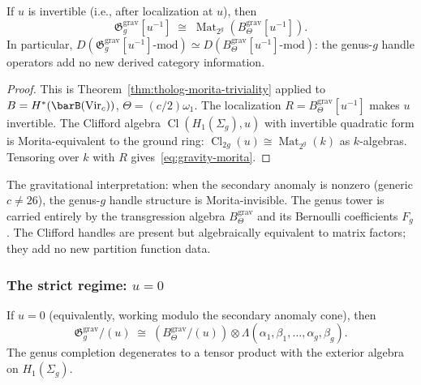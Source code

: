 \begin{theorem}
\label{thm:gravity-morita-triviality}
If $u$ is invertible \textup{(}i.e., after localization at
$u$\textup{)}, then
\begin{equation}\label{eq:gravity-morita}
\mathfrak{G}_g^{\mathrm{grav}}[u^{-1}]
\;\cong\;
\operatorname{Mat}_{2^g}\!\left(
 B_\Theta^{\mathrm{grav}}[u^{-1}]
\right).
\end{equation}
In particular,
$D(\mathfrak{G}_g^{\mathrm{grav}}[u^{-1}]\text{-mod})
\simeq D(B_\Theta^{\mathrm{grav}}[u^{-1}]\text{-mod})$:
the genus-$g$ handle operators add no new derived category
information.
\end{theorem}

\begin{proof}
This is
Theorem~\ref{thm:tholog-morita-triviality}
applied to $B = H^*(\barB(\mathrm{Vir}_c))$,
$\Theta = (c/2)\omega_1$. The localization $R =
B_\Theta^{\mathrm{grav}}[u^{-1}]$ makes $u$
invertible. The Clifford algebra
$\operatorname{Cl}(H_1(\Sigma_g), u)$ with
invertible quadratic form is Morita-equivalent to the ground ring:
$\operatorname{Cl}_{2g}(u) \cong
\operatorname{Mat}_{2^g}(k)$ as $k$-algebras.
Tensoring over $k$ with $R$ gives~\eqref{eq:gravity-morita}.
\end{proof}

The gravitational interpretation: when the secondary anomaly is
nonzero (generic $c \ne 26$), the genus-$g$ handle structure
is Morita-invisible. The genus tower is carried entirely by the
transgression algebra $B_\Theta^{\mathrm{grav}}$ and its Bernoulli
coefficients $F_g$. The Clifford handles are present but
algebraically equivalent to matrix factors; they add no new
partition function data.

\subsubsection*{The strict regime: $u = 0$}

\begin{theorem}[Exterior degeneration at $u = 0$;
\ClaimStatusProvedHere]
\label{thm:gravity-exterior-degeneration}
If $u = 0$ \textup{(}equivalently, working modulo the secondary
anomaly cone\textup{)}, then
\begin{equation}\label{eq:gravity-exterior}
\mathfrak{G}_g^{\mathrm{grav}} / (u)
\;\cong\;
\left(B_\Theta^{\mathrm{grav}} / (u)\right)
\otimes
\Lambda(\alpha_1, \beta_1, \ldots, \alpha_g, \beta_g).
\end{equation}
The genus completion degenerates to a tensor product with the
exterior algebra on $H_1(\Sigma_g)$.
\end{theorem}


